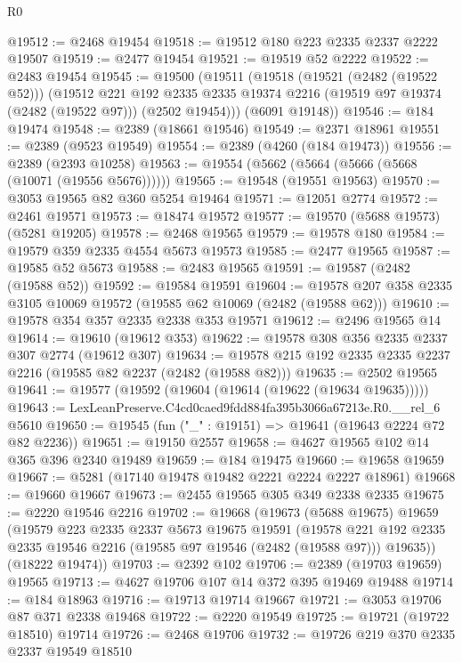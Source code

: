 \begin{lexlean}{R0}
\begin{coremodule}
@19512 := @2468 @19454
@19518 := @19512 @180 @223 @2335 @2337 @2222 @19507
@19519 := @2477 @19454
@19521 := @19519 @52 @2222
@19522 := @2483 @19454
@19545 := @19500
    (@19511
      (@19518
        (@19521 (@2482 (@19522 @52)))
        (@19512
          @221
          @192
          @2335
          @2335
          @19374
          @2216
          (@19519 @97 @19374 (@2482 (@19522 @97)))
          (@2502 @19454)))
      (@6091 @19148))
@19546 := @184 @19474
@19548 := @2389 (@18661 @19546)
@19549 := @2371 @18961
@19551 := @2389 (@9523 @19549)
@19554 := @2389 (@4260 (@184 @19473))
@19556 := @2389 (@2393 @10258)
@19563 := @19554 (@5662 (@5664 (@5666 (@5668 (@10071 (@19556 @5676))))))
@19565 := @19548 (@19551 @19563)
@19570 := @3053 @19565 @82 @360 @5254 @19464
@19571 := @12051 @2774
@19572 := @2461 @19571
@19573 := @18474 @19572
@19577 := @19570 (@5688 @19573) (@5281 @19205)
@19578 := @2468 @19565
@19579 := @19578 @180
@19584 := @19579 @359 @2335 @4554 @5673 @19573
@19585 := @2477 @19565
@19587 := @19585 @52 @5673
@19588 := @2483 @19565
@19591 := @19587 (@2482 (@19588 @52))
@19592 := @19584 @19591
@19604 := @19578 @207 @358 @2335 @3105 @10069 @19572 (@19585 @62 @10069 (@2482 (@19588 @62)))
@19610 := @19578 @354 @357 @2335 @2338 @353 @19571
@19612 := @2496 @19565 @14
@19614 := @19610 (@19612 @353)
@19622 := @19578 @308 @356 @2335 @2337 @307 @2774 (@19612 @307)
@19634 := @19578 @215 @192 @2335 @2335 @2237 @2216 (@19585 @82 @2237 (@2482 (@19588 @82)))
@19635 := @2502 @19565
@19641 := @19577 (@19592 (@19604 (@19614 (@19622 (@19634 @19635)))))
@19643 := LexLeanPreserve.C4cd0caed9fdd884fa395b3066a67213e.R0.__rel_6 @5610
@19650 := @19545 (fun ("_" : @19151) => @19641 (@19643 @2224 @72 @82 @2236))
@19651 := @19150 @2557
@19658 := @4627 @19565 @102 @14 @365 @396 @2340 @19489
@19659 := @184 @19475
@19660 := @19658 @19659
@19667 := @5281 (@17140 @19478 @19482 @2221 @2224 @2227 @18961)
@19668 := @19660 @19667
@19673 := @2455 @19565 @305 @349 @2338 @2335
@19675 := @2220 @19546 @2216
@19702 := @19668
    (@19673
      (@5688 @19675)
      @19659
      (@19579
        @223
        @2335
        @2337
        @5673
        @19675
        @19591
        (@19578 @221 @192 @2335 @2335 @19546 @2216 (@19585 @97 @19546 (@2482 (@19588 @97))) @19635))
      (@18222 @19474))
@19703 := @2392 @102
@19706 := @2389 (@19703 @19659) @19565
@19713 := @4627 @19706 @107 @14 @372 @395 @19469 @19488
@19714 := @184 @18963
@19716 := @19713 @19714 @19667
@19721 := @3053 @19706 @87 @371 @2338 @19468
@19722 := @2220 @19549
@19725 := @19721 (@19722 @18510) @19714
@19726 := @2468 @19706
@19732 := @19726 @219 @370 @2335 @2337 @19549 @18510

\end{coremodule}
\end{lexlean}
